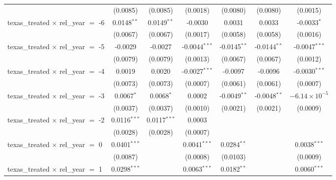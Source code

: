 \begin{tabular}{lcccccc}
                                                & (0.0085)       & (0.0085)       & (0.0018)        & (0.0080)        & (0.0080)        & (0.0015)\\   
   texas\_treated $\times$ rel\_year $=$ -6     & 0.0148$^{**}$  & 0.0149$^{**}$  & -0.0030         & 0.0031          & 0.0033          & -0.0033$^{*}$\\   
                                                & (0.0067)       & (0.0067)       & (0.0017)        & (0.0058)        & (0.0058)        & (0.0016)\\   
   texas\_treated $\times$ rel\_year $=$ -5     & -0.0029        & -0.0027        & -0.0044$^{***}$ & -0.0145$^{**}$  & -0.0144$^{**}$  & -0.0047$^{***}$\\   
                                                & (0.0079)       & (0.0079)       & (0.0013)        & (0.0067)        & (0.0067)        & (0.0012)\\   
   texas\_treated $\times$ rel\_year $=$ -4     & 0.0019         & 0.0020         & -0.0027$^{***}$ & -0.0097         & -0.0096         & -0.0030$^{***}$\\   
                                                & (0.0073)       & (0.0073)       & (0.0007)        & (0.0061)        & (0.0061)        & (0.0007)\\   
   texas\_treated $\times$ rel\_year $=$ -3     & 0.0067$^{*}$   & 0.0068$^{*}$   & 0.0002          & -0.0049$^{**}$  & -0.0048$^{**}$  & $-6.14\times 10^{-5}$\\    
                                                & (0.0037)       & (0.0037)       & (0.0010)        & (0.0021)        & (0.0021)        & (0.0009)\\   
   texas\_treated $\times$ rel\_year $=$ -2     & 0.0116$^{***}$ & 0.0117$^{***}$ & 0.0003          &                 &                 &   \\   
                                                & (0.0028)       & (0.0028)       & (0.0007)        &                 &                 &   \\   
   texas\_treated $\times$ rel\_year $=$ 0      & 0.0401$^{***}$ &                & 0.0041$^{***}$  & 0.0284$^{**}$   &                 & 0.0038$^{***}$\\   
                                                & (0.0087)       &                & (0.0008)        & (0.0103)        &                 & (0.0009)\\   
   texas\_treated $\times$ rel\_year $=$ 1      & 0.0298$^{***}$ &                & 0.0063$^{***}$  & 0.0182$^{**}$   &                 & 0.0060$^{***}$\\   

\end{tabular}
